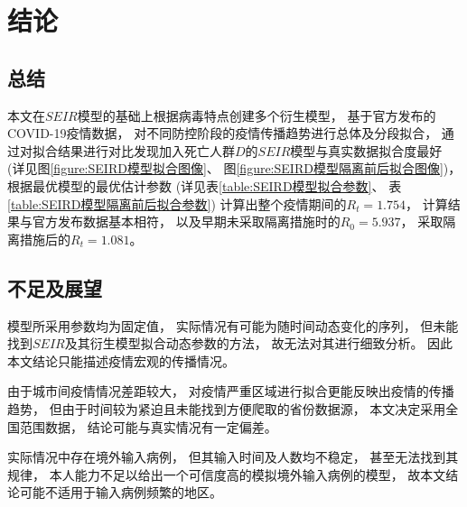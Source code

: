 \section{结论}
\subsection{总结}
\par 本文在$SEIR$模型的基础上根据病毒特点创建多个衍生模型，
基于官方发布的COVID-19疫情数据，
对不同防控阶段的疫情传播趋势进行总体及分段拟合，
通过对拟合结果进行对比发现加入死亡人群$D$的$SEIR$模型与真实数据拟合度最好
(详见图\ref{figure:SEIRD模型拟合图像}、
图\ref{figure:SEIRD模型隔离前后拟合图像})，
根据最优模型的最优估计参数
(详见表\ref{table:SEIRD模型拟合参数}、
表\ref{table:SEIRD模型隔离前后拟合参数})
计算出整个疫情期间的$R_t=1.754$，
计算结果与官方发布数据基本相符，
以及早期未采取隔离措施时的$R_0=5.937$，
采取隔离措施后的$R_t=1.081$。
\subsection{不足及展望}
\par 模型所采用参数均为固定值，
实际情况有可能为随时间动态变化的序列，
但未能找到$SEIR$及其衍生模型拟合动态参数的方法，
故无法对其进行细致分析。
因此本文结论只能描述疫情宏观的传播情况。
\par 由于城市间疫情情况差距较大，
对疫情严重区域进行拟合更能反映出疫情的传播趋势，
但由于时间较为紧迫且未能找到方便爬取的省份数据源，
本文决定采用全国范围数据，
结论可能与真实情况有一定偏差。
\par 实际情况中存在境外输入病例，
但其输入时间及人数均不稳定，
甚至无法找到其规律，
本人能力不足以给出一个可信度高的模拟境外输入病例的模型，
故本文结论可能不适用于输入病例频繁的地区。